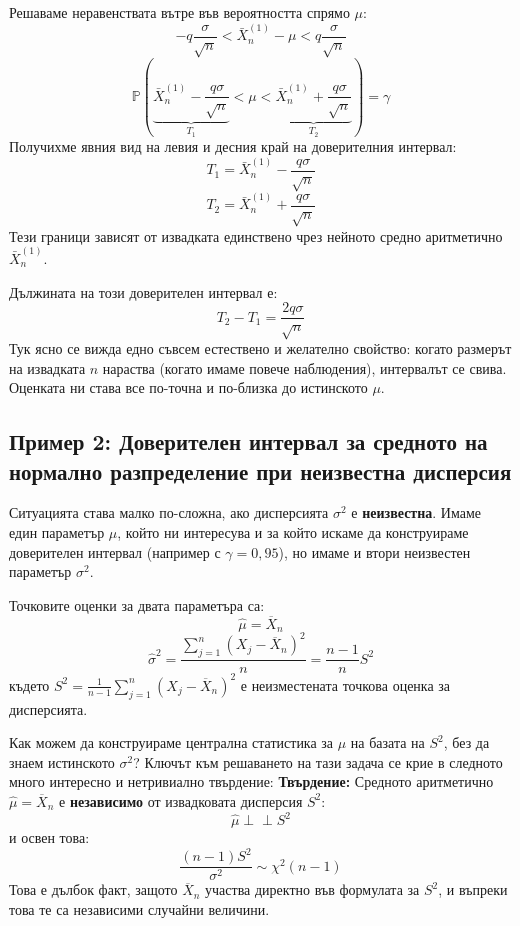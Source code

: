 \documentclass{article}
\begin{document}
Решаваме неравенствата вътре във вероятността спрямо $\mu$:
\[
-q \frac{\sigma}{\sqrt{n}} < \bar{X}_n^{(1)} - \mu < q \frac{\sigma}{\sqrt{n}}
\]
\[
\mathbb{P}\left( \underbrace{\bar{X}_n^{(1)} - \frac{q\sigma}{\sqrt{n}}}_{T_1} < \mu < \underbrace{\bar{X}_n^{(1)} + \frac{q\sigma}{\sqrt{n}}}_{T_2} \right) = \gamma
\]
Получихме явния вид на левия и десния край на доверителния интервал:
\[
T_1 = \bar{X}_n^{(1)} - \frac{q\sigma}{\sqrt{n}}
\]
\[
T_2 = \bar{X}_n^{(1)} + \frac{q\sigma}{\sqrt{n}}
\]
Тези граници зависят от извадката единствено чрез нейното средно аритметично $\bar{X}_n^{(1)}$. 

Дължината на този доверителен интервал е:
\[
T_2 - T_1 = \frac{2q\sigma}{\sqrt{n}}
\]
Тук ясно се вижда едно съвсем естествено и желателно свойство: когато размерът на извадката $n$ нараства (когато имаме повече наблюдения), интервалът се свива. Оценката ни става все по-точна и по-близка до истинското $\mu$. 

\subsection{Пример 2: Доверителен интервал за средното на нормално разпределение при неизвестна дисперсия}
Ситуацията става малко по-сложна, ако дисперсията $\sigma^2$ е \textbf{неизвестна}. Имаме един параметър $\mu$, който ни интересува и за който искаме да конструираме доверителен интервал (например с $\gamma = 0,95$), но имаме и втори неизвестен параметър $\sigma^2$.

Точковите оценки за двата параметъра са:
\[
\hat{\mu} = \overline{X}_n
\]
\[
\hat{\sigma}^2 = \frac{\sum_{j=1}^n (X_j - \overline{X}_n)^2}{n} = \frac{n-1}{n} S^2
\]
където $S^2 = \frac{1}{n-1} \sum_{j=1}^n (X_j - \overline{X}_n)^2$ е неизместената точкова оценка за дисперсията.

Как можем да конструираме централна статистика за $\mu$ на базата на $S^2$, без да знаем истинското $\sigma^2$? Ключът към решаването на тази задача се крие в следното много интересно и нетривиално твърдение:
\textbf{Твърдение:} Средното аритметично $\hat{\mu} = \overline{X}_n$ е \textbf{независимо} от извадковата дисперсия $S^2$:
\[
\hat{\mu} \perp\!\!\!\perp S^2
\]
и освен това:
\[
\frac{(n-1)S^2}{\sigma^2} \sim \chi^2(n-1)
\]
Това е дълбок факт, защото $\overline{X}_n$ участва директно във формулата за $S^2$, и въпреки това те са независими случайни величини.
\end{document}
